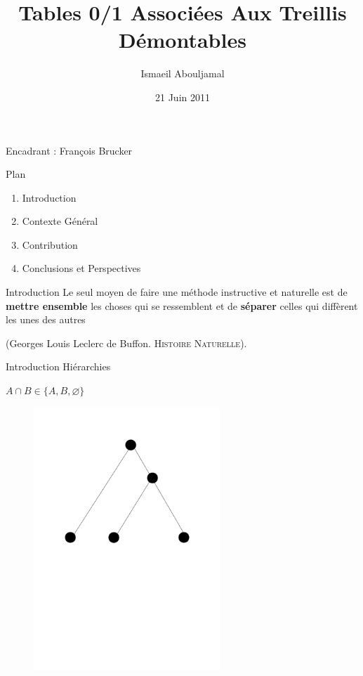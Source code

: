 \documentclass{beamer}
\title{Tables 0/1 Associées Aux Treillis Démontables}
\author{Ismaeil Abouljamal}
\date{21 Juin 2011}
\institute{LIF (UMR 6166)}
\begin{document}
  \begin{frame}
  \titlepage
  \begin{center}
  {Encadrant : François Brucker}
  \end{center}
  \end{frame}
 
  \begin{frame}{Plan}
  \begin{enumerate}
   \item Introduction	
   \item Contexte Général
   \item Contribution
   \item Conclusions et Perspectives
   \end{enumerate}
  \end{frame}

  \begin{frame}{Introduction}
  \og Le seul moyen de faire une méthode instructive et naturelle est de \textbf{mettre ensemble} les choses qui se ressemblent et de \textbf{séparer} celles qui diffèrent
  les unes des autres\fg 

  (Georges Louis Leclerc de Buffon. \textsc{Histoire Naturelle}).
  \end{frame}

  \begin{frame}{Introduction}
  \LARGE {\textrm{Hiérarchies}}

  $A \cap B \in \{A, B, \varnothing\}$
   \begin{figure}
	\includegraphics[width=7cm]{images/memoire_figure0_treillis.png} 
    \end{figure}
  \end{frame}
\end{document}
